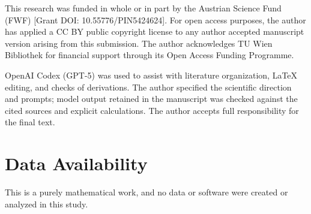 \documentclass[aps,pra,reprint,superscriptaddress,amsmath,amssymb,floatfix]{revtex4-2}
\theoremstyle{plain}
\theoremstyle{definition}
\theoremstyle{remark}
\begin{document}
\begin{acknowledgments}
This research was funded in whole or in part by the Austrian Science Fund
(FWF) [Grant DOI: 10.55776/PIN5424624]. For open access purposes, the author
has applied a CC BY public copyright license to any author accepted manuscript
version arising from this submission. The author acknowledges TU Wien
Bibliothek for financial support through its Open Access Funding Programme.

OpenAI Codex (GPT-5) was used to assist with literature organization, LaTeX
editing, and checks of derivations. The author specified the scientific
direction and prompts; model output retained in the manuscript was checked
against the cited sources and explicit calculations. The author accepts full
responsibility for the final text.
\end{acknowledgments}

\section*{Data Availability}
This is a purely mathematical work, and no data or software were created or
analyzed in this study.


\end{document}
